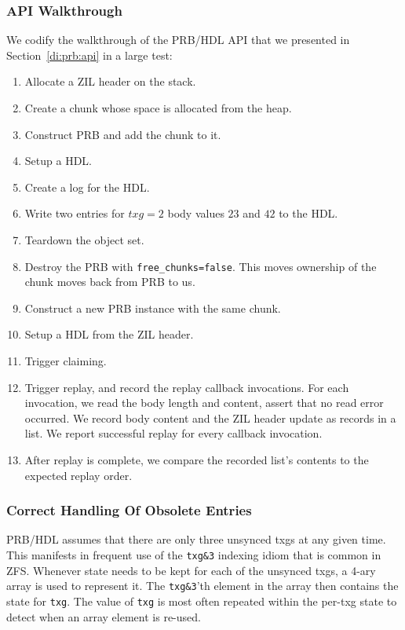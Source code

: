 \documentclass[12pt,a4paper,twoside]{book}
\begin{document}
\subsubsection{API Walkthrough}
We codify the walkthrough of the PRB/HDL API that we presented in Section~\ref{di:prb:api} in a large test:
\begin{enumerate}[noitemsep]
    \item Allocate a ZIL header on the stack.
    \item Create a chunk whose space is allocated from the heap.
    \item Construct PRB and add the chunk to it.
    \item Setup a HDL.
    \item Create a log for the HDL.
    \item Write two entries for $txg=2$ body values $23$ and $42$ to the HDL.
    \item Teardown the object set.
    \item Destroy the PRB with \lstinline{free_chunks=false}. This moves ownership of the chunk moves back from PRB to us.
    \item Construct a new PRB instance with the same chunk.
    \item Setup a HDL from the ZIL header.
    \item Trigger claiming.
    \item Trigger replay, and record the replay callback invocations.
        For each invocation, we read the body length and content, assert that no read error occurred.
        We record body content and the ZIL header update as records in a list.
        We report successful replay for every callback invocation.
    \item After replay is complete, we compare the recorded list's contents to the expected replay order.
\end{enumerate}

\subsubsection{Correct Handling Of Obsolete Entries}
PRB/HDL assumes that there are only three unsynced txgs at any given time.
This manifests in frequent use of the \lstinline{txg&3} indexing idiom that is common in ZFS.
Whenever state needs to be kept for each of the unsynced txgs, a 4-ary array is used to represent it.
The \lstinline{txg&3}'th element in the array then contains the state for \lstinline{txg}.
The value of \lstinline{txg} is most often repeated within the per-txg state to detect when an array element is re-used.
\end{document}
